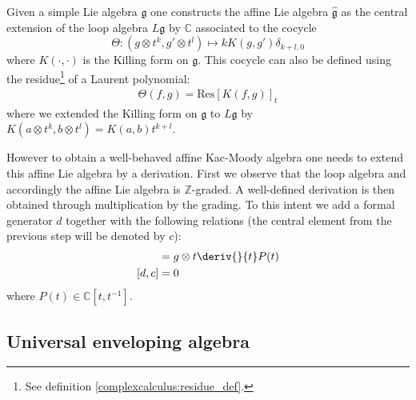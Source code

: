         \begin{construct}
        	Given a simple Lie algebra $\mathfrak{g}$ one constructs the affine Lie algebra $\hat{\mathfrak{g}}$ as the central extension of the loop algebra $L\mathfrak{g}$ by $\mathbb{C}$ associated to the cocycle \[\Theta:(g\otimes t^k, g'\otimes t^l)\mapsto kK(g, g')\delta_{k+l, 0}\] where $K(\cdot, \cdot)$ is the Killing form on $\mathfrak{g}$. This cocycle can also be defined using the residue\footnote{See definition \ref{complexcalculus:residue_def}.} of a Laurent polynomial:
        	\begin{gather}
        		\Theta(f, g) = \text{Res}\left[K(f, g)\right]_t
        	\end{gather}
        	where we extended the Killing form on $\mathfrak{g}$ to $L\mathfrak{g}$ by $K(a\otimes t^k, b\otimes t^l)=K(a, b)t^{k+l}$.
        	
        	However to obtain a well-behaved affine Kac-Moody algebra one needs to extend this affine Lie algebra by a derivation. First we observe that the loop algebra and accordingly the affine Lie algebra is $\mathbb{Z}$-graded. A well-defined derivation is then obtained through multiplication by the grading. To this intent we add a formal generator $d$ together with the following relations (the central element from the previous step will be denoted by $c$):
        	\begin{align}
        		[d, g\otimes P(t)] &= g\otimes t\deriv{}{t}P(t)\\
        		[d, c] &= 0
        	\end{align}
        	where $P(t)\in\mathbb{C}[t, t^{-1}]$.
        \end{construct}

\subsection{Universal enveloping algebra}

